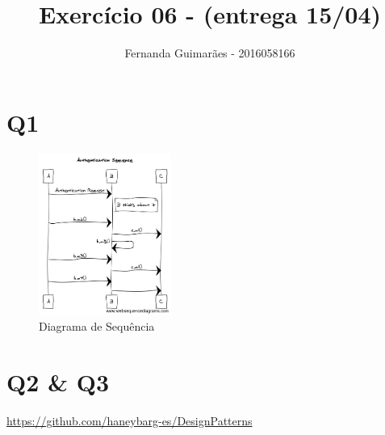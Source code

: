 \documentclass[11pt]{article}
\author{Fernanda Guimarães - 2016058166}
\date{}
\title{Exercício 06 - (entrega 15/04)}
\begin{document}
\maketitle

\section{Q1}
\label{sec:orgda2c960}
\begin{figure}[H]
\centering
\includegraphics[height=200px]{./sequence.png}
\caption{Diagrama de Sequência}
\end{figure}

\section{Q2 \& Q3}
\label{sec:orge563db5}
\url{https://github.com/haneybarg-es/DesignPatterns}
\end{document}
